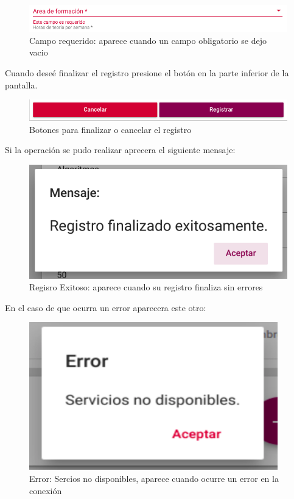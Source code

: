 \begin{figure}[!hbtp]
    \centering
    \hypertarget{requeridoR}{\includegraphics[width=0.7\linewidth]{images/GUA/requerido}}
    \caption{Campo requerido: aparece cuando un campo obligatorio se dejo vacio}
    \label{requeridoR}
\end{figure}
Cuando deseé finalizar el registro presione el botón  en la parte inferior de la pantalla.\\
\begin{figure}[!hbtp]
    \centering
    \hypertarget{registrarBtnR}{\includegraphics[width=0.7\linewidth]{images/GUA/registrarBtn}}
    \caption{Botones para finalizar o cancelar el registro}
    \label{registrarBtnR}
\end{figure}
Si la operación se pudo realizar aprecera el siguiente mensaje:\\
\begin{figure}[!hbtp]
    \centering
    \hypertarget{exito}{\includegraphics[width=0.7\linewidth]{images/GUA/exito}}
    \caption{Regisro Exitoso: aparece cuando su registro finaliza sin errores}
    \label{exito}
\end{figure}
En el caso de que ocurra un error aparecera este otro:\\
\begin{figure}[!hbtp]
    \centering
    \hypertarget{errorR}{\includegraphics[width=0.7\linewidth]{images/GUA/error}}
    \caption{Error: Sercios no disponibles, aparece cuando ocurre un error en la conexión}
    \label{errorR}
\end{figure}
